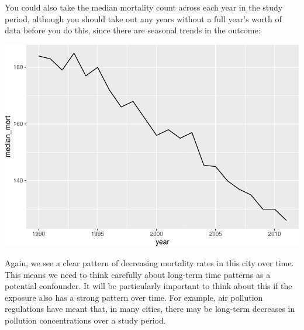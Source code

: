 \documentclass[
]{book}
\newenvironment{Shaded}{\begin{snugshade}}{\end{snugshade}}
\newcommand{\CommentTok}[1]{\textcolor[rgb]{0.56,0.35,0.01}{\textit{#1}}}
\newcommand{\DataTypeTok}[1]{\textcolor[rgb]{0.13,0.29,0.53}{#1}}
\newcommand{\DecValTok}[1]{\textcolor[rgb]{0.00,0.00,0.81}{#1}}
\newcommand{\KeywordTok}[1]{\textcolor[rgb]{0.13,0.29,0.53}{\textbf{#1}}}
\newcommand{\NormalTok}[1]{#1}
\newcommand{\OperatorTok}[1]{\textcolor[rgb]{0.81,0.36,0.00}{\textbf{#1}}}
\newcommand{\StringTok}[1]{\textcolor[rgb]{0.31,0.60,0.02}{#1}}
\begin{document}
You could also take the median mortality count across each year in the
study period, although you should take out any years without a full year's
worth of data before you do this, since there are seasonal trends in the
outcome:

\begin{Shaded}
\end{Shaded}

\includegraphics{adv_epi_analysis_files/figure-latex/unnamed-chunk-16-1.pdf}

Again, we see a clear pattern of decreasing mortality rates in this city over time.
This means we need to think carefully about long-term time patterns as a potential
confounder. It will be particularly important to think about this if the exposure
also has a strong pattern over time. For example, air pollution regulations have
meant that, in many cities, there may be long-term decreases in pollution
concentrations over a study period.
\end{document}

